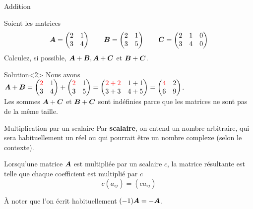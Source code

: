 \documentclass[french]{beamer}
\begin{document}
\begin{frame}{Addition}
\begin{example}
    Soient les matrices \[
    \boldsymbol{A} = \begin{pmatrix}
        2 & 1 \\
        3 & 4
        \end{pmatrix}
    \qquad
    \boldsymbol{B} = \begin{pmatrix}
        2 & 1 \\
        3 & 5
        \end{pmatrix}
        \qquad
    \boldsymbol{C} = \begin{pmatrix}
        2 & 1 & 0\\
        3 & 4 & 0
        \end{pmatrix}
    \]
    Calculez, si possible, $\boldsymbol{A}+\boldsymbol{B}, \boldsymbol{A}+\boldsymbol{C}$ et $\boldsymbol{B}+\boldsymbol{C}$.
\end{example}
\begin{block}{Solution}<2>
    Nous avons $\displaystyle
    \boldsymbol{A}+\boldsymbol{B} = \begin{pmatrix}
                {\color{red}2} & 1\\
                3 & 4
                \end{pmatrix} + 
                \begin{pmatrix}
                {\color{red}2} & 1\\
                3 & 5
                \end{pmatrix} = \begin{pmatrix}
                {\color{red}2+2} & 1+1\\
                3+3 & 4+5
                \end{pmatrix} = \begin{pmatrix}
            {\color{red}4} & 2\\
            6 & 9
            \end{pmatrix}
    $.\\[5pt]   
    Les sommes $\boldsymbol{A}+\boldsymbol{C}$ et $\boldsymbol{B}+\boldsymbol{C}$ sont indéfinies parce que les matrices ne
    sont pas de la même taille.
    \end{block}
\end{frame}

\begin{frame}{Multiplication par un scalaire}
Par \textbf{scalaire}, on entend un nombre arbitraire, qui sera
habituellement un réel ou qui pourrait être un nombre complexe (selon
le contexte).   
\begin{definition}
Lorsqu'une matrice $\boldsymbol{A}$ est multipliée par un scalaire $c$,
la matrice résultante est telle que chaque coefficient est multiplié par $c$
\[
c(a_{ij}) = (ca_{ij})
\]
\end{definition}

À noter que l'on écrit habituellement $(-1) \boldsymbol{A} = -\boldsymbol{A}$.
\end{frame}
\end{document}

